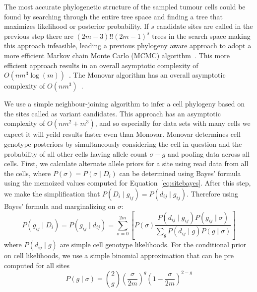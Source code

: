\documentclass[../../main.tex]{subfiles}
\begin{document}
The most accurate phylogenetic structure of the sampled tumour cells could be found by searching through the entire tree space and finding a tree that maximizes likelihood or posterior probability. If $s$ candidate sites are called in the previous step there are $(2m-3)!!(2m-1)^s$ trees in the search space making this approach infeasible, leading a previous phylogeny aware approach to adopt a more efficient Markov chain Monte Carlo (MCMC) algorithm~\cite{sciphi}. This more efficient approach results in an overall asymptotic complexity of $O(nm^3\log(m))$~\cite{sciphi}. The Monovar algorithm has an overall asymptotic complexity of $O(nm^3)$~\cite{monovar}.

We use a simple neighbour-joining algorithm to infer a cell phylogeny based on the sites called as variant candidates. This approach has an asymptotic complexity of $O(nm^2+m^3)$, and so especially for data sets with many cells we expect it will yeild results faster even than Monovar.
Monovar determines cell genotype posteriors by simultaneously considering the cell in question and the probability of all other cells having allele count $\sigma-g$ and pooling data across all cells. First, we calculate alternate allele priors for a site using read data from all the cells, where $P(\sigma) = P(\sigma\mid D_i)$ can be determined using Bayes' formula using the memoized values computed for Equation~\ref{eq:sitebayes}. After this step, we make the simplification that $P(D_i\mid g_{ij}) = P(d_{ij}\mid g_{ij})$. Therefore using Bayes' formula and marginalizing on $\sigma$:
\begin{equation*}
P(g_{ij}\mid D_i) = P(g_{ij}\mid d_{ij}) = \sum_{\sigma=0}^{2m}  \left[ P(\sigma) \frac{P(d_{ij}\mid g_{ij})P(g_{ij}\mid \sigma)}{\sum_g P(d_{ij}\mid g)P(g \mid \sigma)} \right]
\end{equation*}
where $P(d_{ij}\mid g)$ are simple cell genotype likelihoods. For the conditional prior on cell likelihoods, we use a simple binomial approximation that can be pre computed for all sites
\begin{equation*}
P(g\mid \sigma) = \binom{2}{g} \left(\frac{\sigma}{2m}\right)^g \left(1-\frac{\sigma}{2m}\right)^{2-g}
\end{equation*}
\end{document}
